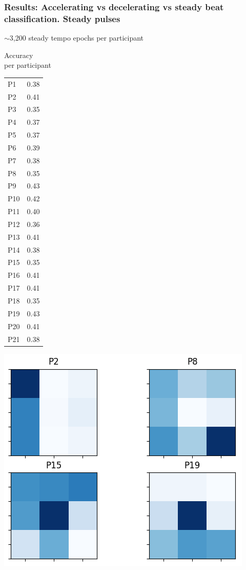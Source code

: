 \documentclass{beamer}
\begin{document}
\begin{frame}
	\frametitle{Results: Accelerating vs decelerating vs steady beat classification. Steady pulses}

	$\mathtt{\sim}$3,200 steady tempo epochs per participant

	\begin{minipage}{0.3\linewidth}
	Accuracy \\
	per participant
	\begin{table}
	\tiny
	\begin{tabular}{l|l}
		P1 & 0.38 \\
		P2 & 0.41 \\
		P3 & 0.35 \\
		P4 & 0.37 \\
		P5 & 0.37 \\
		P6 & 0.39 \\
		P7 & 0.38 \\
		P8 & 0.35 \\
		P9 & 0.43 \\
		P10 & 0.42 \\
		P11 & 0.40 \\
		P12 & 0.36 \\
		P13 & 0.41 \\
		P14 & 0.38 \\
		P15 & 0.35 \\
		P16 & 0.41 \\
		P17 & 0.41 \\
		P18 & 0.35 \\
		P19 & 0.43 \\
		P20 & 0.41 \\
		P21 & 0.38 \\
	\end{tabular}
	\end{table}
	\end{minipage}
	\begin{minipage}{0.6\linewidth}
		\centering
		\includegraphics[scale=0.6]{fig17.png}
	\end{minipage}

\end{frame}
\end{document}
